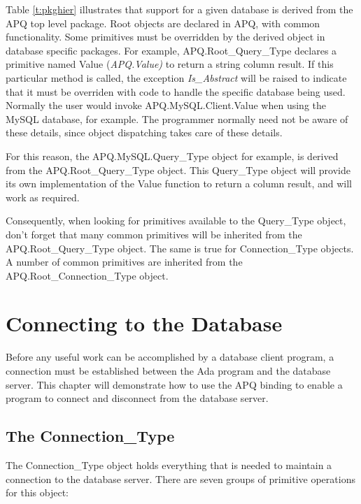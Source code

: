 \documentclass[english,letterpaper]{book}
\begin{document}
Table \ref{t:pkghier} illustrates that support for a given database is derived
from the APQ top level package. Root objects are declared in APQ,
with common functionality. Some primitives must be overridden by the
derived object in database specific packages. For example, APQ.Root\_Query\_Type
declares a primitive named Value (\emph{APQ.Value)} to return a string
column result. If this particular method is called, the exception
\emph{Is\_Abstract} will be raised to indicate that it must be overriden
with code to handle the specific database being used. Normally the
user would invoke APQ\-.MySQL\-.Client\-.Value when using the MySQL database,
for example. The programmer normally need not be aware of these details,
since object dispatching takes care of these details.

For this reason, the APQ\-.MySQL\-.Query\_Type object for example, is
derived from the APQ\-.Root\_Query\_Type object. This Query\_Type object
will provide its own implementation of the Value function to return
a column result, and will work as required.

Consequently, when looking for primitives available to the Query\_Type
object, don't forget that many common primitives will be inherited
from the APQ\-.Root\-\_Query\-\_Type object. The same is true for Connection\-\_Type
objects. A number of common primitives are inherited from the APQ\-.Root\_Connection\_Type
object.


\chapter{Connecting to the Database}

Before any useful work can be accomplished by a database client program,
a connection must be established between the Ada program and the database
server. This chapter will demonstrate how to use the APQ binding to
enable a program to connect and disconnect
from the database server.

\section{The Connection\_Type}

The Connection\_Type object holds everything that is needed to maintain
a connection to the database server. There are seven groups of primitive
operations for this object:
\end{document}
